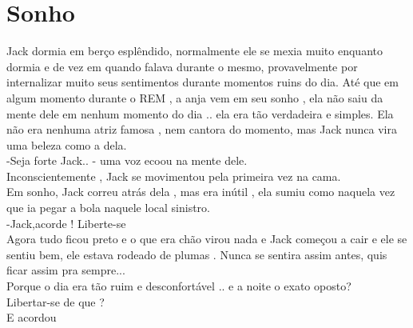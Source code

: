 \documentclass{book}
\begin{document}
 \section*{Sonho}
 
 Jack dormia em berço esplêndido, normalmente ele se mexia muito enquanto dormia e de vez em quando falava durante o mesmo, provavelmente por internalizar muito seus sentimentos durante momentos ruins do dia. Até que em algum momento durante o REM , a anja vem em seu sonho , ela não saiu da mente dele em nenhum momento do dia .. ela era tão verdadeira e simples. Ela não era nenhuma atriz famosa , nem cantora do momento, mas Jack nunca vira uma beleza como a dela. \\
 
 -Seja forte Jack.. - uma voz ecoou na mente dele.\\
 Inconscientemente , Jack se movimentou pela primeira vez na cama.\\
 Em sonho, Jack correu atrás dela , mas era inútil , ela sumiu como naquela vez que ia pegar a bola naquele local sinistro. \\
 -Jack,acorde ! Liberte-se\\
 Agora tudo ficou preto e o que era chão virou nada e Jack começou a cair e ele se sentiu bem, ele estava rodeado de plumas . Nunca se sentira assim antes, quis ficar assim pra sempre...\\
 Porque o dia era tão ruim e desconfortável .. e a noite o exato oposto?\\
 Libertar-se de que ?\\
 
 E acordou  \\
 
\end{document}
